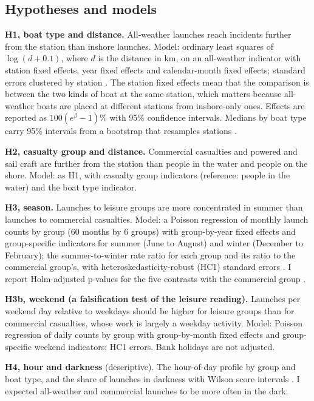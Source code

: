 \documentclass[11pt,a4paper]{article}
\begin{document}
\subsection{Hypotheses and models}
\textbf{H1, boat type and distance.} All-weather launches reach incidents further from the station than inshore launches. Model: ordinary least squares of $\log(d + 0.1)$, where $d$ is the distance in km, on an all-weather indicator with station fixed effects, year fixed effects and calendar-month fixed effects; standard errors clustered by station \citep{cameron2015,abadie2023}. The station fixed effects mean that the comparison is between the two kinds of boat at the same station, which matters because all-weather boats are placed at different stations from inshore-only ones. Effects are reported as $100(e^{\beta} - 1)\%$ with 95\% confidence intervals. Medians by boat type carry 95\% intervals from a bootstrap that resamples stations \citep{efron1993}.

\textbf{H2, casualty group and distance.} Commercial casualties and powered and sail craft are further from the station than people in the water and people on the shore. Model: as H1, with casualty group indicators (reference: people in the water) and the boat type indicator.

\textbf{H3, season.} Launches to leisure groups are more concentrated in summer than launches to commercial casualties. Model: a Poisson regression of monthly launch counts by group (60 months by 6 groups) with group-by-year fixed effects and group-specific indicators for summer (June to August) and winter (December to February); the summer-to-winter rate ratio for each group and its ratio to the commercial group's, with heteroskedasticity-robust (HC1) standard errors \citep{mackinnon1985}. I report Holm-adjusted p-values for the five contrasts with the commercial group \citep{holm1979}.

\textbf{H3b, weekend (a falsification test of the leisure reading).} Launches per weekend day relative to weekdays should be higher for leisure groups than for commercial casualties, whose work is largely a weekday activity. Model: Poisson regression of daily counts by group with group-by-month fixed effects and group-specific weekend indicators; HC1 errors. Bank holidays are not adjusted.

\textbf{H4, hour and darkness} (descriptive). The hour-of-day profile by group and boat type, and the share of launches in darkness with Wilson score intervals \citep{wilson1927}. I expected all-weather and commercial launches to be more often in the dark.
\end{document}
